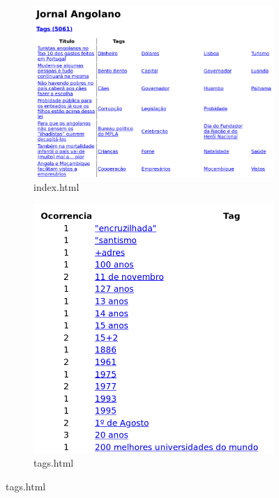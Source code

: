 \documentclass[a4paper]{article}
\begin{document}
\begin{figure}[H]
    \centering
    \begin{subfigure}{0.54\textwidth}
        \includegraphics[width=\textwidth]{./index_print.png}
        \caption{index.html}
    \end{subfigure}
    \begin{subfigure}{0.45\textwidth}
        \includegraphics[width=\textwidth]{./tags_print.png}
        \caption{tags.html}

\end{subfigure}
\end{figure}
\end{document}
